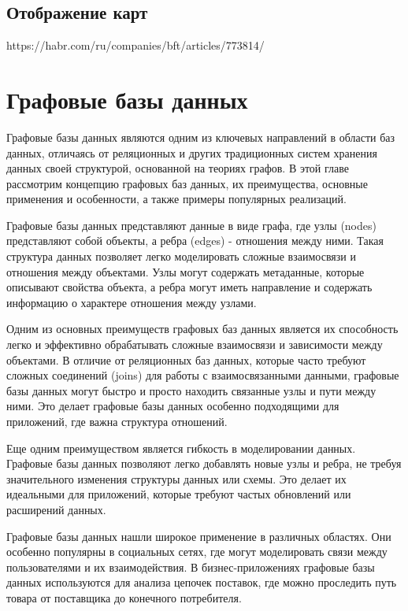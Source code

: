 \subsection{Отображение карт}

https://habr.com/ru/companies/bft/articles/773814/

\section{Графовые базы данных}

Графовые базы данных являются одним из ключевых направлений в области баз данных, отличаясь от реляционных и других традиционных систем хранения данных своей структурой, основанной на теориях графов. В этой главе рассмотрим концепцию графовых баз данных, их преимущества, основные применения и особенности, а также примеры популярных реализаций.

Графовые базы данных представляют данные в виде графа, где узлы (nodes) представляют собой объекты, а ребра (edges) - отношения между ними. Такая структура данных позволяет легко моделировать сложные взаимосвязи и отношения между объектами. Узлы могут содержать метаданные, которые описывают свойства объекта, а ребра могут иметь направление и содержать информацию о характере отношения между узлами.

Одним из основных преимуществ графовых баз данных является их способность легко и эффективно обрабатывать сложные взаимосвязи и зависимости между объектами. В отличие от реляционных баз данных, которые часто требуют сложных соединений (joins) для работы с взаимосвязанными данными, графовые базы данных могут быстро и просто находить связанные узлы и пути между ними. Это делает графовые базы данных особенно подходящими для приложений, где важна структура отношений.

Еще одним преимуществом является гибкость в моделировании данных. Графовые базы данных позволяют легко добавлять новые узлы и ребра, не требуя значительного изменения структуры данных или схемы. Это делает их идеальными для приложений, которые требуют частых обновлений или расширений данных.

Графовые базы данных нашли широкое применение в различных областях. Они особенно популярны в социальных сетях, где могут моделировать связи между пользователями и их взаимодействия. В бизнес-приложениях графовые базы данных используются для анализа цепочек поставок, где можно проследить путь товара от поставщика до конечного потребителя.

